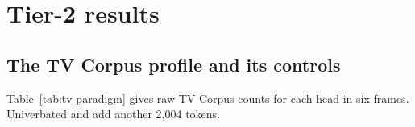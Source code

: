 \documentclass[12pt]{article}
\begin{document}
\section{Tier-2 results}
\label{sec:tier2}

\subsection{The TV Corpus profile and its controls}
\label{sec:tv-profile}

Table~\ref{tab:tv-paradigm} gives raw TV Corpus counts for each head in six frames. Univerbated  and  add another 2,004 tokens.
\end{document}
